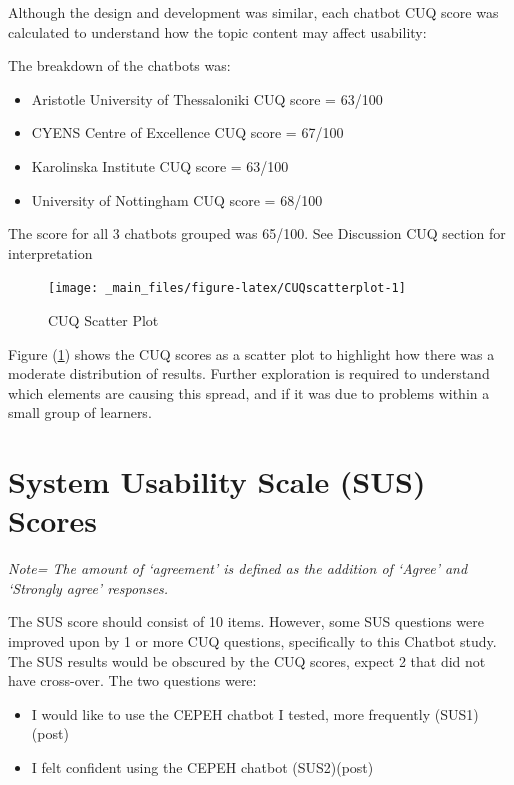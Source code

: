 \documentclass[a4paper, nobind]{templates/ociamthesis}
\providecommand{\tightlist}{%
  \setlength{\itemsep}{0pt}\setlength{\parskip}{0pt}}
\begin{document}
Although the design and development was similar, each chatbot CUQ score
was calculated to understand how the topic content may affect usability:

The breakdown of the chatbots was:

\begin{itemize}
\tightlist
\item
  Aristotle University of Thessaloniki CUQ score = 63/100
\item
  CYENS Centre of Excellence CUQ score = 67/100
\item
  Karolinska Institute CUQ score = 63/100
\item
  University of Nottingham CUQ score = 68/100
\end{itemize}

The score for all 3 chatbots grouped was 65/100. See Discussion CUQ
section for interpretation

\begin{figure}

{\centering \texttt{[image: \_main\_files/figure-latex/CUQscatterplot-1]} 

}

\caption{CUQ Scatter Plot}\label{fig:CUQscatterplot}
\end{figure}

Figure (\ref{fig:CUQscatterplot}) shows the CUQ scores as a scatter
plot to highlight how there was a moderate distribution of results.
Further exploration is required to understand which elements are causing
this spread, and if it was due to problems within a small group of
learners.

\hypertarget{system-usability-scale-sus-scores}{%
\section{System Usability Scale (SUS) Scores}\label{system-usability-scale-sus-scores}}

\emph{Note= The amount of `agreement' is defined as the addition of `Agree'
and `Strongly agree' responses.}

The SUS score should consist of 10 items. However, some SUS questions
were improved upon by 1 or more CUQ questions, specifically to this
Chatbot study. The SUS results would be obscured by the CUQ scores,
expect 2 that did not have cross-over. The two questions were:

\begin{itemize}
\tightlist
\item
  I would like to use the CEPEH chatbot I tested, more frequently
  (SUS1)(post)
\item
  I felt confident using the CEPEH chatbot (SUS2)(post)
\end{itemize}
\end{document}
